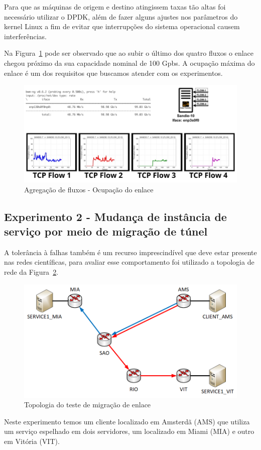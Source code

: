 \documentclass[12pt]{article}
\begin{document}
Para que as máquinas de origem e destino atingissem taxas tão altas foi necessário utilizar o DPDK, além de fazer alguns ajustes nos parâmetros do kernel Linux a fim de evitar que interrupções do sistema operacional causem interferências.

Na Figura~\ref{fig:agregacao} pode ser observado que ao subir o último dos quatro fluxos o enlace chegou próximo da sua capacidade nominal de 100 Gpbs. A ocupação máxima do enlace é um dos requisitos que buscamos atender com os experimentos.

\begin{figure}[ht]
\centering
\includegraphics[width=.5\textwidth]{AgregacaoLink.png}
\caption{Agregação de fluxos - Ocupação do enlace}
\label{fig:agregacao}
\end{figure}

\subsection{Experimento 2 - Mudança de instância de serviço por meio de migração de túnel}

A tolerância à falhas também é um recurso imprescindível que deve estar presente nas redes científicas, para avaliar esse comportamento foi utilizado a topologia de rede da Figura~\ref{fig:topologia1}.

\begin{figure}[ht]
\centering
\includegraphics[width=.5\textwidth]{Topologias-polka 1.png}
\caption{Topologia do teste de migração de enlace}
\label{fig:topologia1}
\end{figure}

Neste experimento temos um cliente localizado em Amsterdã (AMS) que utiliza um serviço espelhado em dois servidores, um  localizado em Miami (MIA) e outro em Vitória (VIT).
\end{document}
